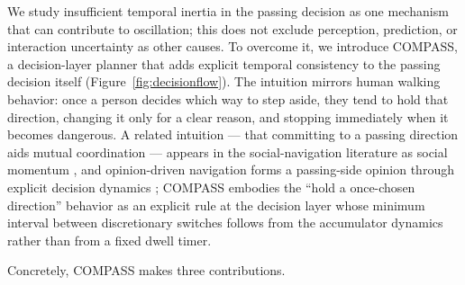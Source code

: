 \documentclass[11pt]{article}
\begin{document}
We study insufficient temporal inertia in the passing decision as one mechanism that can contribute to oscillation; this does not exclude perception, prediction, or interaction uncertainty as other causes. To overcome it, we introduce COMPASS, a decision-layer planner that adds explicit temporal consistency to the passing decision itself (Figure~\ref{fig:decisionflow}). The intuition mirrors human walking behavior: once a person decides which way to step aside, they tend to hold that direction, changing it only for a clear reason, and stopping immediately when it becomes dangerous. A related intuition --- that committing to a passing direction aids mutual coordination --- appears in the social-navigation literature as social momentum \cite{mavrogiannis2022momentum}, and opinion-driven navigation forms a passing-side opinion through explicit decision dynamics \cite{cathcart2023opinion}; COMPASS embodies the ``hold a once-chosen direction'' behavior as an explicit rule at the decision layer whose minimum interval between discretionary switches follows from the accumulator dynamics rather than from a fixed dwell timer.

Concretely, COMPASS makes three contributions.
\end{document}
